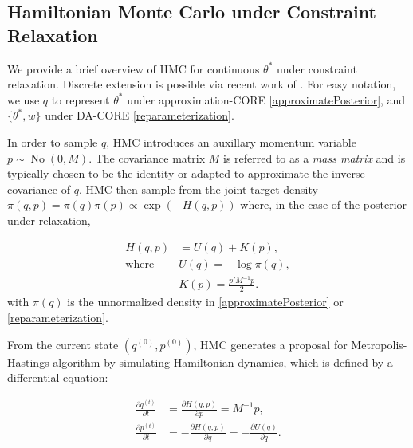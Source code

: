 \documentclass[10pt,fleqn]{article}
\newcommand{\mc}[1]{\mathcal{#1}}
\DeclareMathOperator{\No}{No}
\DeclareMathOperator{\1}{\mathbbm{1}}
\newcommand{\mass}{M} %
\begin{document}
\subsection{Hamiltonian Monte Carlo under Constraint Relaxation}

We provide a brief overview of HMC for continuous $\theta^*$ under constraint relaxation. Discrete extension is possible via recent work of \cite{nishimura2017discontinuous}. For easy notation, we use $q$ to represent $\theta^*$ under approximation-CORE \eqref{approximatePosterior}, and $\{\theta^*, w\}$ under DA-CORE \eqref{reparameterization}.

In order to sample $q$, HMC introduces an auxillary momentum variable $p \sim \No(0, \mass)$. The covariance matrix $\mass$ is referred to as a \textit{mass matrix} and is typically chosen to be the identity or adapted to approximate the inverse covariance of $q$. HMC then sample from the joint target density $\pi(q, p) = \pi(q) \pi(p) \propto \exp (- H(q, p))$ where, in the case of the posterior under relaxation, 


\begin{equation}
\begin{aligned}
H(q, p)& = U(q)+K(p),\\
\text{where } & U(q) = -\log\pi(q),\\
& K(p) = \frac{p'\mass^{-1} p}{2}.
\end{aligned}
\end{equation}
with $\pi(q)$ is the unnormalized density in \eqref{approximatePosterior} or \eqref{reparameterization}. %

From the current state $(q^{(0)},p^{(0)})$, HMC generates a proposal for Metropolis-Hastings algorithm by simulating Hamiltonian dynamics, which is defined by a differential equation:

\begin{equation}
\begin{aligned}
\label{hamiltonian}
\frac{\partial q ^{(t)}}{\partial t} & =\frac{\partial H(q, p)}{\partial p} = \mass^{-1}p,\\
\frac{\partial p^{(t)}}{\partial t}& =-\frac{\partial H(q, p)}{\partial q} = -\frac{\partial U(q)}{\partial q}.
\end{aligned}
\end{equation}
\end{document}
